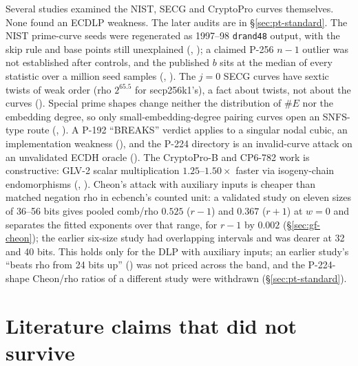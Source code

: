 Several studies examined the NIST, SECG and CryptoPro curves themselves.
None found an ECDLP weakness. The later audits are in \S\ref{sec:pt-standard}. The NIST prime-curve seeds were regenerated as
1997--98 \texttt{drand48} output, with the skip rule and base points still
unexplained (,
); a claimed P-256 $n-1$
outlier was not established after controls, and the published $b$ sits at the
median of every statistic over a million seed samples
(,
). The $j=0$ SECG curves have
sextic twists of weak order (rho $2^{65.5}$ for secp256k1's), a fact about
twists, not about the curves ().
Special prime shapes change neither the distribution of $\#E$ nor the
embedding degree, so only small-embedding-degree pairing curves open an
SNFS-type route (,
). A P-192 ``BREAKS'' verdict
applies to a singular nodal cubic, an implementation weakness
(), and the P-224 directory is an
invalid-curve attack on an unvalidated ECDH oracle
(). The CryptoPro-B and CP6-782 work is
constructive: GLV-2 scalar multiplication $1.25$--$1.50\times$ faster via
isogeny-chain endomorphisms (,
). Cheon's attack with auxiliary
inputs is cheaper than matched negation rho in ecbench's counted unit: a
validated study on eleven sizes of 36--56 bits gives pooled comb/rho
$0.525$ ($r-1$) and $0.367$ ($r+1$) at $w=0$ and separates the fitted
exponents over that range, for $r-1$ by $0.002$ (\S\ref{sec:gf-cheon}); the
earlier six-size study had overlapping intervals and was dearer at 32 and 40
bits. This holds only for the DLP with auxiliary inputs; an
earlier study's ``beats rho from 24 bits up''
() was not priced across
the band, and the P-224-shape Cheon/rho ratios of a different study were
withdrawn (\S\ref{sec:pt-standard}).

\section{Literature claims that did not survive}

